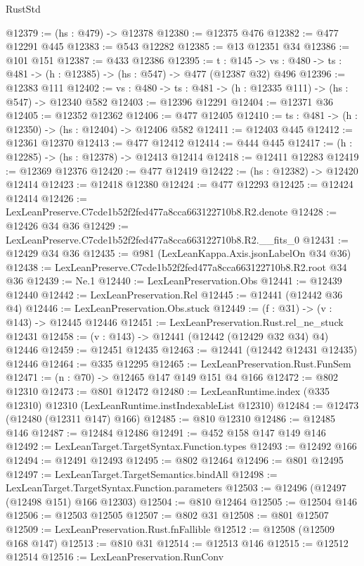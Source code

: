 \begin{lexlean}{RustStd}
\begin{coremodule}
@12379 := (hs : @479) -> @12378
@12380 := @12375 @476
@12382 := @477 @12291 @445
@12383 := @543 @12282
@12385 := @13 @12351 @34
@12386 := @101 @151
@12387 := @433 @12386
@12395 := {t : @145} ->
  {vs : @480} -> {ts : @481} -> (h : @12385) -> (hs : @547) -> @477 (@12387 @32) @496
@12396 := @12383 @111
@12402 := {vs : @480} -> {ts : @481} -> (h : @12335 @111) -> (hs : @547) -> @12340 @582
@12403 := @12396 @12291
@12404 := @12371 @36
@12405 := @12352 @12362
@12406 := @477 @12405
@12410 := {ts : @481} -> (h : @12350) -> (hs : @12404) -> @12406 @582
@12411 := @12403 @445
@12412 := @12361 @12370
@12413 := @477 @12412
@12414 := @444 @445
@12417 := (h : @12285) -> (hs : @12378) -> @12413 @12414
@12418 := @12411 @12283
@12419 := @12369 @12376
@12420 := @477 @12419
@12422 := (hs : @12382) -> @12420 @12414
@12423 := @12418 @12380
@12424 := @477 @12293
@12425 := @12424 @12414
@12426 := LexLeanPreserve.C7cde1b52f2fed477a8cca663122710b8.R2.denote
@12428 := @12426 @34 @36
@12429 := LexLeanPreserve.C7cde1b52f2fed477a8cca663122710b8.R2.__fits_0
@12431 := @12429 @34 @36
@12435 := @981 (LexLeanKappa.Axis.jsonLabelOn @34 @36)
@12438 := LexLeanPreserve.C7cde1b52f2fed477a8cca663122710b8.R2.root @34 @36
@12439 := Ne.{1}
@12440 := LexLeanPreservation.Obs
@12441 := @12439 @12440
@12442 := LexLeanPreservation.Rel
@12445 := @12441 (@12442 @36 @4)
@12446 := LexLeanPreservation.Obs.stuck
@12449 := (f : @31) -> (v : @143) -> @12445 @12446
@12451 := LexLeanPreservation.Rust.rel_ne_stuck @12431
@12458 := (v : @143) -> @12441 (@12442 (@12429 @32 @34) @4) @12446
@12459 := @12451 @12435
@12463 := @12441 (@12442 @12431 @12435) @12446
@12464 := @335 @12295
@12465 := LexLeanPreservation.Rust.FunSem
@12471 := (n : @70) -> @12465 @147 @149 @151 @4 @166
@12472 := @802 @12310
@12473 := @801 @12472
@12480 := LexLeanRuntime.index (@335 @12310) @12310 (LexLeanRuntime.instIndexableList @12310)
@12484 := @12473 (@12480 (@12311 @147) @166)
@12485 := @810 @12310
@12486 := @12485 @146
@12487 := @12484 @12486
@12491 := @452 @158 @147 @149 @146
@12492 := LexLeanTarget.TargetSyntax.Function.types
@12493 := @12492 @166
@12494 := @12491 @12493
@12495 := @802 @12464
@12496 := @801 @12495
@12497 := LexLeanTarget.TargetSemantics.bindAll
@12498 := LexLeanTarget.TargetSyntax.Function.parameters
@12503 := @12496 (@12497 (@12498 @151) @166 @12303)
@12504 := @810 @12464
@12505 := @12504 @146
@12506 := @12503 @12505
@12507 := @802 @31
@12508 := @801 @12507
@12509 := LexLeanPreservation.Rust.fnFallible
@12512 := @12508 (@12509 @168 @147)
@12513 := @810 @31
@12514 := @12513 @146
@12515 := @12512 @12514
@12516 := LexLeanPreservation.RunConv

\end{coremodule}
\end{lexlean}
